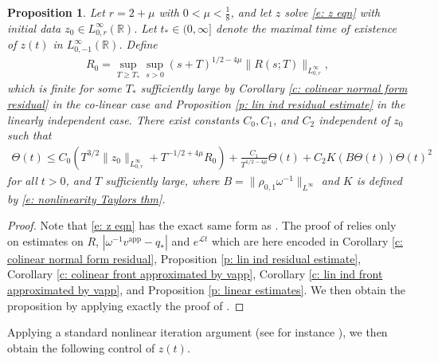 \documentclass[11pt]{article}
\newcommand{\R}{\mathbb{R}}
\newcommand{\mcl}{\mathcal{L}}
\newtheorem{prop}{Proposition}
\numberwithin{equation}{section}
\numberwithin{prop}{section}
\begin{document}
\begin{prop}\label{p: theta control}
	Let $r = 2 + \mu$ with $0 < \mu < \frac{1}{8}$, and let $z$ solve \eqref{e: z eqn} with initial data $z_0 \in L^\infty_{0, r}(\R)$. Let $t_* \in (0, \infty]$ denote the maximal time of existence of $z(t)$ in $L^\infty_{0, -1}(\R)$. Define
	\begin{align}
	R_0 = \sup_{T\geq T_*} \sup_{s > 0} (s+T)^{1/2-4\mu} \| R(s; T) \|_{L^\infty_{0, r}},\label{e: R0 def}
	\end{align}
	which is finite for some $T_*$ sufficiently large by Corollary \ref{c: colinear normal form residual} in the co-linear case and Proposition \ref{p: lin ind residual estimate} in the linearly independent case. 
	There exist constants $C_0, C_1$, and $C_2$ independent of $z_0$ such that 
	\begin{align}
	\Theta(t) \leq C_0 \left( T^{3/2} \| z_0 \|_{L^\infty_{0,r}} + T^{-1/2+4\mu} R_0 \right) + \frac{C_1}{T^{1/2-4\mu}} \Theta(t) + C_2 K (B \Theta(t)) \Theta(t)^2
	\end{align}
	for all $t > 0$, and $T$ sufficiently large, where $B = \| \rho_{0,1} \omega^{-1} \|_{L^\infty}$ and $K$ is defined by \eqref{e: nonlinearity Taylors thm}. 
\end{prop}
\begin{proof}
	Note that \eqref{e: z eqn} has the exact same form as \cite[equation (5.4)]{CAMS}. The proof of \cite[Proposition 5.2]{CAMS} relies only on estimates on $R$, $| \omega^{-1} v^\mathrm{app} - q_*|$ and $e^{\mcl t}$ which are here encoded in Corollary \ref{c: colinear normal form residual}, Proposition \ref{p: lin ind residual estimate}, Corollary \ref{c: colinear front approximated by vapp}, Corollary \ref{c: lin ind front approximated by vapp}, and Proposition \ref{p: linear estimates}. We then obtain the proposition by applying exactly the proof of \cite[Proposition 5.2]{CAMS}. 
\end{proof}

Applying a standard nonlinear iteration argument (see for instance \cite[Section 5.4]{CAMS}), we then obtain the following control of $z(t)$.
\end{document}
